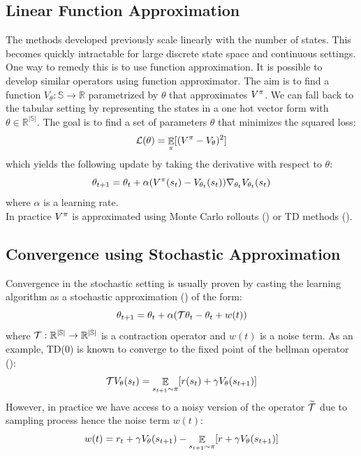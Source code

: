 \subsection{Linear Function Approximation}
The methods developed previously scale linearly with the number of states. This becomes quickly intractable for large discrete state space and continuous settings. One way to remedy this is to use function approximation. It is possible to develop similar operators using function approximator.
The aim is to find a function $V_\theta: \mathbb{S} \rightarrow \mathbb{R}$ parametrized by $\theta$ that approximates $V^{\pi}$. We can fall back to the tabular setting by representing the states in a one hot vector form with $\theta \in \mathbb{R^{|\mathbb{S}|}}$. The goal is to find a set of parameters $\theta$ that minimizes the squared loss:
\begin{equation}\label{simple_loss}
    \mathcal{L}(\theta) = \mathop{\mathbb{E}}_{\pi} [(V^{\pi} - V_\theta)^2]
\end{equation}
which yields the following update by taking the derivative with respect to $\theta$:
\begin{equation}
    \theta_{t+1} = \theta_t + \alpha (V^{\pi}(s_t) - V_{\theta_t}(s_t)) \nabla_{\theta_t} V_{\theta_t}(s_t)
\end{equation}
where $\alpha$ is a learning rate.\\
In practice $V^{\pi}$ is approximated using Monte Carlo rollouts (\cite{suttonreinforcement}) or TD methods (\cite{sutton1988learning}).

\subsection{Convergence using Stochastic Approximation}
Convergence in the stochastic setting is usually proven by casting the learning algorithm as a stochastic approximation (\cite{tsitsiklis1994asynchronous,borkar2009stochastic,borkar2000ode}) of the form:
\begin{equation}\label{stoch}
    \theta_{t+1} = \theta_t + \alpha( \mathcal{T} \theta_t  - \theta_t + w(t)) 
\end{equation}
where $\mathcal{T}: \mathbb{R^{|\mathbb{S}|}} \rightarrow \mathbb{R^{|\mathbb{S}|}}$ is a contraction operator and $w(t)$ is a noise term. 
As an example, TD(0) is known to converge to the fixed point of the bellman operator (\cite{sutton1988learning}):
\begin{equation}
    \mathcal{T} V_{\theta}(s_t) = \mathop{\mathbb{E}}_{s_{t+1} \sim \pi} [r(s_t) + \gamma V_{\theta}(s_{t+1})]
\end{equation}
However, in practice we have access to a noisy version of the operator $\widetilde{\mathcal{T}}$ due to sampling process hence the noise term $w(t)$:
\begin{equation}
    w(t) = r_t + \gamma V_{\theta} (s_{t+1}) - \mathop{\mathbb{E}}_{s_{t+1} \sim \pi} [r + \gamma V_{\theta}(s_{t+1})]
\end{equation}

